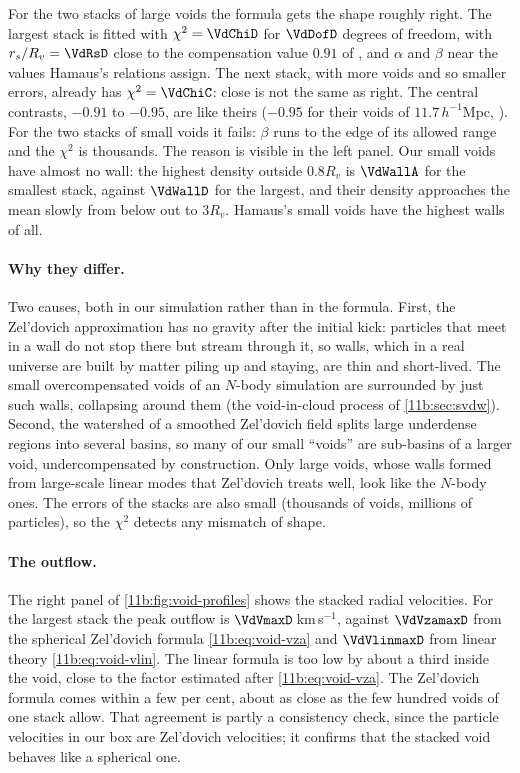 For the two stacks of large voids the formula gets the shape roughly right. The
largest stack is fitted with $\chi^2=\VdChiD$ for $\VdDofD$ degrees of freedom, with
$r_s/R_v=\VdRsD$ close to the compensation value $0.91$ of
, and $\alpha$ and $\beta$ near the
values Hamaus's relations assign. The next stack, with more voids and so smaller
errors, already has $\chi^2=\VdChiC$: close is not the same as right. The central contrasts, $-0.91$ to $-0.95$, are like
theirs ($-0.95$ for their voids of $11.7\,h^{-1}$Mpc, ). For the two stacks of small voids it fails: $\beta$ runs
to the edge of its allowed range and the $\chi^2$ is thousands. The reason is
visible in the left panel. Our small voids have almost no wall: the highest density
outside $0.8R_v$ is $\VdWallA$ for the smallest stack, against $\VdWallD$ for the
largest, and their density approaches the mean slowly from below out to $3R_v$.
Hamaus's small voids have the highest walls of all.

\paragraph{Why they differ.}
Two causes, both in our simulation rather than in the formula. First, the
Zel'dovich approximation has no gravity after the initial kick: particles that meet
in a wall do not stop there but stream through it, so walls, which in a real
universe are built by matter piling up and staying, are thin and short-lived. The
small overcompensated voids of an $N$-body simulation are surrounded by just such
walls, collapsing around them (the void-in-cloud process of \cref{11b:sec:svdw}).
Second, the watershed of a smoothed Zel'dovich field splits large underdense
regions into several basins, so many of our small ``voids'' are sub-basins of a
larger void, undercompensated by construction. Only large voids, whose walls
formed from large-scale linear modes that Zel'dovich treats well, look like the
$N$-body ones. The errors of the stacks are also small (thousands of voids, millions
of particles), so the $\chi^2$ detects any mismatch of shape.

\paragraph{The outflow.}
The right panel of \cref{11b:fig:void-profiles} shows the stacked radial
velocities. For the largest stack the peak outflow is $\VdVmaxD$\,km\,s$^{-1}$,
against $\VdVzamaxD$ from the spherical Zel'dovich formula \eqref{11b:eq:void-vza}
and $\VdVlinmaxD$ from linear theory \eqref{11b:eq:void-vlin}. The linear formula
is too low by about a third inside the void, close to the factor estimated after
\eqref{11b:eq:void-vza}. The Zel'dovich formula comes within a few per cent,
about as close as the few hundred voids of one stack allow. That agreement is
partly a consistency check, since the particle velocities in our box are
Zel'dovich velocities; it confirms that the stacked void behaves like a spherical
one.

